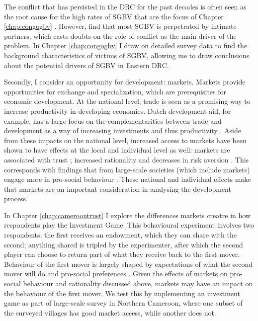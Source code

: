The conflict that has persisted in the DRC for the past decades is often seen as the root cause for the high rates of SGBV that are the focus of Chapter \ref{chap:congogbv} \citep{Baaz2013,Kirby2015,Johnson2010}. However, \cite{Peterman2011} find that most SGBV is perpetrated by intimate partners, which casts doubts on the role of conflict as the main driver of the problem. In Chapter \ref{chap:congogbv} I draw on detailed survey data to find the background characteristics of victims of SGBV, allowing me to draw conclusions about the potential drivers of SGBV in Eastern DRC.

Secondly, I consider an opportunity for development: markets. Markets provide opportunities for exchange and specialization, which are prerequisites for economic development. At the national level, trade is seen as a promising way to increase productivity in developing economies. Dutch development aid, for example, has a large focus on the complementarities between trade and development as a way of increasing investments and thus productivity \citep[see e.g.][]{Zoomers2014}. Aside from these impacts on the national level, increased access to markets have been shown to have effects at the local and individual level as well: markets are associated with trust \citep{Tu2010,Fischer2008}; increased rationality \citep{List2008,Cecchi2013,Braga2009} and decreases in risk aversion \citep{Melesse2015}. This corresponds with findings that from large-scale societies (which include markets) engage more in pro-social behaviour \cite{Henrich2005,Henrich2010}. These national and individual effects make that markets are an important consideration in analysing the development process. 

In Chapter \ref{chap:cameroontrust} I explore the differences markets creatre in how respondents play the Investment Game. This behavioural experiment involves two respondents; the first receives an endowment, which they can share with the second; anything shared is tripled by the experimenter, after which the second player can choose to return part of what they receive back to the first mover. Behaviour of the first mover is largely shaped by expectations of what the second mover will do and pro-social preferences \citep{Berg1995,Ashraf2006,Roth1995,Sapienza2013}. Given the effects of markets on pro-social behaviour and rationality discussed above, markets may have an impact on the behaviour of the first mover. We test this by implementing an investment game as part of large-scale survey in Northern Cameroon, where one subset of the surveyed villages has good market access, while another does not.

